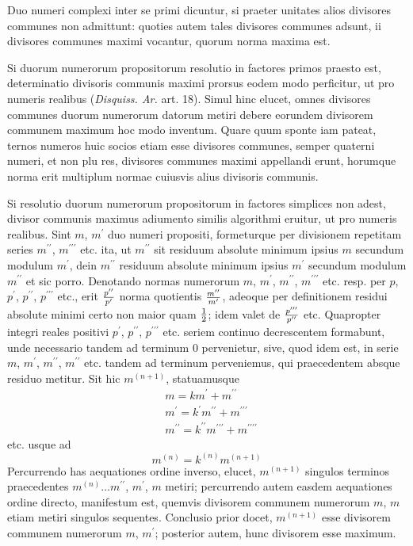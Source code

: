 \documentclass[twoside,12pt]{memoir}
\let\oldfrac\frac
\def\frac#1#2{\mathchoice{\tfrac{#1}{#2}}{\oldfrac{#1}{#2}}{\genfrac{}{}{}{2}{#1}{#2\mathstrut}}{\genfrac{}{}{}{3}{#1}{#2\mathstrut}}}
\begin{document}
Duo numeri complexi inter se primi dicuntur, si praeter unitates alios divisores communes non admittunt: quoties autem tales divisores communes adsunt, ii divisores communes maximi vocantur, quorum norma maxima est.
 
Si duorum numerorum propositorum resolutio in factores primos praesto est, determinatio divisoris communis maximi prorsus eodem modo perficitur, ut pro numeris realibus (\textit{Disquiss. Ar.} art. 18). Simul hinc elucet, omnes divisores communes duorum numerorum datorum metiri debere eorundem divisorem communem maximum hoc modo inventum. Quare quum sponte iam pateat, ternos numeros huic socios etiam esse divisores communes, semper quaterni numeri, et non plu\pagebreak%
res, divisores communes maximi appellandi erunt, horumque norma erit multiplum normae cuiusvis alius divisoris communis.

Si resolutio duorum numerorum propositorum in factores simplices non adest, divisor communis maximus adiumento similis algorithmi eruitur, ut pro numeris realibus. Sint \(m\), \({m}^{\prime}\) duo numeri propositi, formeturque per divisionem repetitam series \(m^{\prime \prime}\), \(m^{\prime \prime \prime}\) etc. ita, ut \(m^{\prime \prime}\) sit residuum absolute minimum ipsius \(m\) secundum modulum \(m^{\prime}\), dein \(m^{\prime \prime}\) residuum absolute minimum ipsius \(m^{\prime}\) secundum modulum \(m^{\prime \prime}\) et sic porro. Denotando normas numerorum \(m\), \(m^{\prime}\), \(m^{\prime \prime}\), \(m^{\prime \prime \prime}\) etc. resp. per \(p\), \(p^{\prime}\), \(p^{\prime \prime}\), \(p^{\prime \prime \prime}\) etc., erit \(\frac{p^{\prime \prime}}{p^{\prime}}\) norma quotientis \(\frac{m^{\prime \prime}}{m^{\prime}}\), adeoque per definitionem residui absolute minimi certo non maior quam \(\frac{1}{2}\); idem valet de \(\frac{p^{\prime \prime \prime}}{p^{\prime \prime}}\) etc. Quapropter integri reales positivi \(p^{\prime}\), \( p^{\prime \prime}\), \(p^{\prime \prime \prime}\) etc. seriem continuo decrescentem formabunt, unde necessario tandem ad terminum \(0\) pervenietur, sive, quod idem est, in serie \(m\), \(m^{\prime}\), \(m^{\prime \prime}\), \(m^{\prime \prime}\) etc. tandem ad terminum perveniemus, qui praecedentem absque residuo metitur. Sit hic \(m^{(n+1)}\), statuamusque
\[\begin{aligned}
& m=k m^{\prime}+m^{\prime \prime} \\
& m^{\prime}=k^{\prime} m^{\prime \prime}+m^{\prime \prime \prime} \\
& m^{\prime \prime}=k^{\prime \prime} m^{\prime \prime \prime}+m^{\prime \prime \prime \prime}
\end{aligned}\]
etc. usque ad
\[m^{(n)}=k^{(n)} m^{(n+1)}\]
Percurrendo has aequationes ordine inverso, elucet, \(m^{(n+1)}\) singulos terminos praecedentes \(m^{(n)} \ldots m^{\prime \prime}\), \(m^{\prime}\), \(m\) metiri; percurrendo autem easdem aequationes ordine directo, manifestum est, quemvis divisorem communem numerorum \(m\), \(m\) etiam metiri singulos sequentes. Conclusio prior docet, \(m^{(n+1)}\) esse divisorem communem numerorum \(m\), \(m^{\prime}\); posterior autem, hunc divisorem esse maximum.
 
\end{document}
